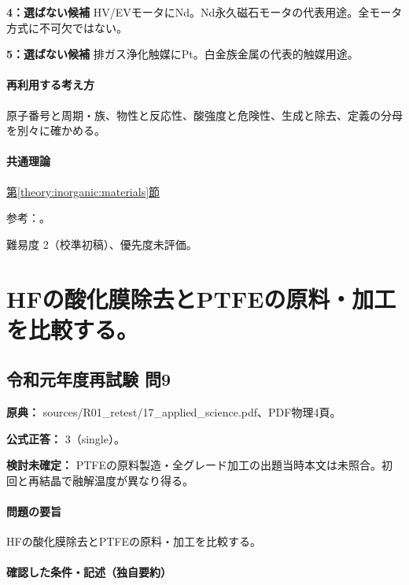 \noindent\textbf{4：選ばない候補} HV/EVモータにNd。Nd永久磁石モータの代表用途。全モータ方式に不可欠ではない。\par

\noindent\textbf{5：選ばない候補} 排ガス浄化触媒にPt。白金族金属の代表的触媒用途。\par

\paragraph{再利用する考え方} 原子番号と周期・族、物性と反応性、酸強度と危険性、生成と除去、定義の分母を別々に確かめる。

\paragraph{共通理論} \hyperref[theory:inorganic:materials]{第\ref*{theory:inorganic:materials}節}

\par 参考：\cite{inorganic_blueled,inorganic_rareuses,inorganic_searesources}。

\par 難易度 2（校準初稿）、優先度未評価。

\section{HFの酸化膜除去とPTFEの原料・加工を比較する。}

\subsection{令和元年度再試験 問9}
\label{q:r01-ret-applied-09}

\noindent\textbf{原典：} sources/R01\_retest/17\_applied\_science.pdf、PDF物理4頁。

\textbf{公式正答：} 3（single）。

\par\textbf{検討未確定：} PTFEの原料製造・全グレード加工の出題当時本文は未照合。初回と再結晶で融解温度が異なり得る。

\paragraph{問題の要旨} HFの酸化膜除去とPTFEの原料・加工を比較する。

\paragraph{確認した条件・記述（独自要約）}\mbox{}\par

